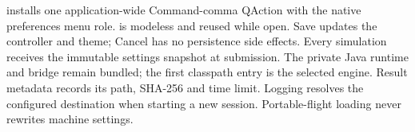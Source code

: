  installs one application-wide Command-comma QAction with the
native preferences menu role.  is modeless and reused while
open. Save updates the controller and theme; Cancel has no persistence side
effects. Every simulation receives the immutable settings snapshot at submission.
The private Java runtime and bridge remain bundled; the first classpath entry
is the selected engine. Result metadata records its path, SHA-256 and time limit.
Logging resolves the configured destination when starting a new session.
Portable-flight loading never rewrites machine settings.


